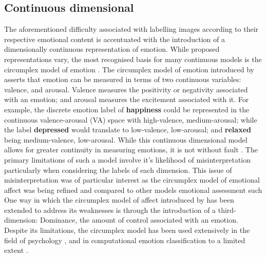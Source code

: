 \documentclass{article}
\begin{document}
\subsection{Continuous dimensional}

The aforementioned difficulty associated with labelling images according to their respective emotional content is accentuated with the introduction of a dimensionally continuous representation of emotion.
While proposed representations vary, the most recognised basis for many continuous models is the circumplex model of emotion \citep{russell1980circumplex}.
The circumplex model of emotion introduced by \citet{russell1980circumplex} asserts that emotion can be measured in terms of two continuous variables: valence, and arousal.
Valence measures the positivity or negativity associated with an emotion; and arousal measures the excitement associated with it.
For example, the discrete emotion label of \textbf{happiness} could be represented in the continuous valence-arousal (VA) space with high-valence, medium-arousal; while the label \textbf{depressed} would translate to low-valence, low-arousal; and \textbf{relaxed} being medium-valence, low-arousal.
While this continuous dimensional model allows for greater continuity in measuring emotions, it is not without fault \citep{larsen1992promises}.
The primary limitations of such a model involve it's likelihood of misinterpretation particularly when considering the labels of each dimension.
This issue of misinterpretation was of particular interest as the circumplex model of emotional affect was being refined and compared to other models emotional assessment such 
One way in which the circumplex model of affect introduced by \citet{russell1980circumplex} has been extended to address its weaknesses is through the introduction of a third-dimension: Dominance, the amount of control associated with an emotion.
Despite its limitations, the circumplex model has been used extensively in the field of psychology \citep{bradley1994measuring,warriner2013norms}, and in computational emotion classification to a limited extent \citep{zhao2016predicting}.
\end{document}
